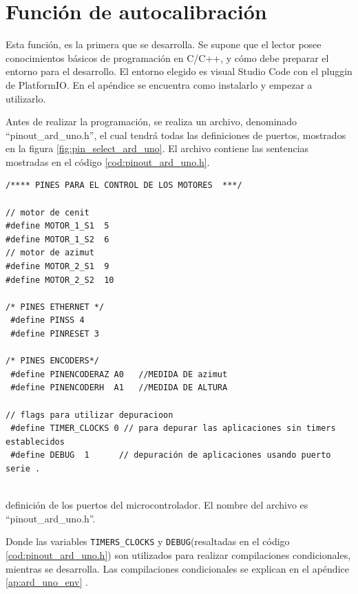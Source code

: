 



%
\section{Función de autocalibración}
Esta función, es la primera que se desarrolla. Se supone que el lector posee conocimientos básicos de programación en C/C++, y cómo debe preparar el entorno para el desarrollo. El entorno elegido es visual Studio Code con el pluggin de PlatformIO. En el apéndice se encuentra como instalarlo y empezar a utilizarlo. 

Antes de realizar la programación, se realiza un archivo, denominado ``pinout\_ard\_uno.h'', el cual tendrá todas las definiciones de puertos, mostrados en la figura \ref{fig:pin_select_ard_uno}. El archivo contiene las sentencias mostradas en el código \ref{cod:pinout_ard_uno.h}. 


\begin{listing}[ht]

	\begin{verbatim}
/**** PINES PARA EL CONTROL DE LOS MOTORES  ***/
		
// motor de cenit 
#define MOTOR_1_S1  5
#define MOTOR_1_S2  6
// motor de azimut 
#define MOTOR_2_S1  9 
#define MOTOR_2_S2  10 
		
/* PINES ETHERNET */
 #define PINSS 4
 #define PINRESET 3  
		
/* PINES ENCODERS*/
 #define PINENCODERAZ A0   //MEDIDA DE azimut 
 #define PINENCODERH  A1   //MEDIDA DE ALTURA 
		
// flags para utilizar depuracioon 
 #define TIMER_CLOCKS 0 // para depurar las aplicaciones sin timers establecidos  
 #define DEBUG  1      // depuración de aplicaciones usando puerto serie .  
		
\end{verbatim}
	\vspace{-5mm}
	\caption{definición de los puertos del microcontrolador. El nombre del archivo es ``pinout\_ard\_uno.h''.}
	\label{cod:pinout_ard_uno.h} 
\end{listing}
Donde las variables \texttt{TIMERS_CLOCKS} y \texttt{DEBUG}(resaltadas en el código  \ref{cod:pinout_ard_uno.h}) son utilizados para realizar compilaciones condicionales, mientras se desarrolla. Las compilaciones condicionales se explican en el apéndice \ref{ap:ard_uno_env} .
 
